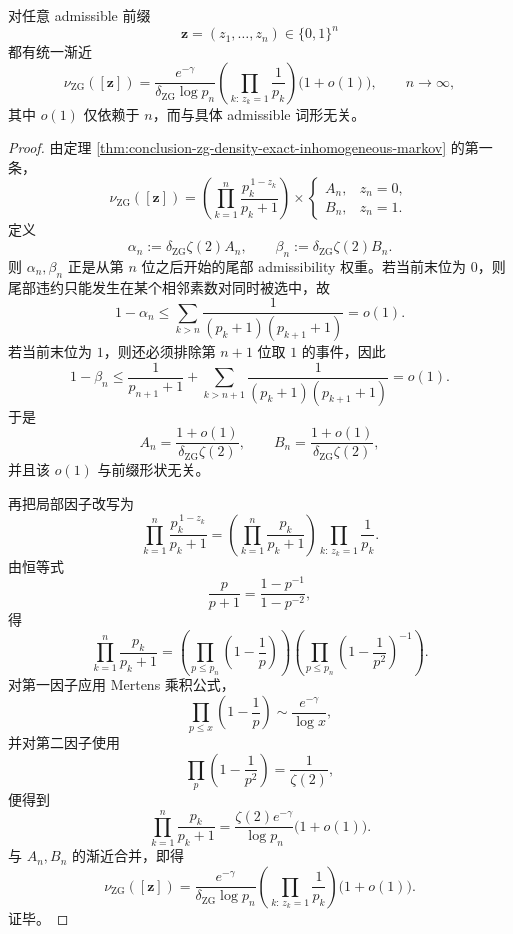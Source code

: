 \begin{theorem}\label{thm:conclusion-zg-cylinder-uniform-asymptotic}
对任意 admissible 前缀
\[
\mathbf z=(z_1,\dots,z_n)\in\{0,1\}^n
\]
都有统一渐近
\[
\nu_{\mathrm{ZG}}([\mathbf z])
=
\frac{e^{-\gamma}}{\delta_{\mathrm{ZG}}\log p_n}
\left(
\prod_{k:\,z_k=1}\frac1{p_k}
\right)
\bigl(1+o(1)\bigr),
\qquad n\to\infty,
\]
其中 \(o(1)\) 仅依赖于 \(n\)，而与具体 admissible 词形无关。
\end{theorem}
\begin{proof}
由定理 \ref{thm:conclusion-zg-density-exact-inhomogeneous-markov} 的第一条，
\[
\nu_{\mathrm{ZG}}([\mathbf z])
=
\left(\prod_{k=1}^{n}\frac{p_k^{\,1-z_k}}{p_k+1}\right)
\times
\begin{cases}
A_n,& z_n=0,\\
B_n,& z_n=1.
\end{cases}
\]
定义
\[
\alpha_n:=\delta_{\mathrm{ZG}}\zeta(2)A_n,
\qquad
\beta_n:=\delta_{\mathrm{ZG}}\zeta(2)B_n.
\]
则 \(\alpha_n,\beta_n\) 正是从第 \(n\) 位之后开始的尾部 admissibility 权重。若当前末位为 \(0\)，则尾部违约只能发生在某个相邻素数对同时被选中，故
\[
1-\alpha_n
\le
\sum_{k>n}\frac{1}{(p_k+1)(p_{k+1}+1)}
=o(1).
\]
若当前末位为 \(1\)，则还必须排除第 \(n+1\) 位取 \(1\) 的事件，因此
\[
1-\beta_n
\le
\frac{1}{p_{n+1}+1}
+
\sum_{k>n+1}\frac{1}{(p_k+1)(p_{k+1}+1)}
=o(1).
\]
于是
\[
A_n=\frac{1+o(1)}{\delta_{\mathrm{ZG}}\zeta(2)},
\qquad
B_n=\frac{1+o(1)}{\delta_{\mathrm{ZG}}\zeta(2)},
\]
并且该 \(o(1)\) 与前缀形状无关。

再把局部因子改写为
\[
\prod_{k=1}^{n}\frac{p_k^{\,1-z_k}}{p_k+1}
=
\left(\prod_{k=1}^{n}\frac{p_k}{p_k+1}\right)
\prod_{k:\,z_k=1}\frac1{p_k}.
\]
由恒等式
\[
\frac{p}{p+1}=\frac{1-p^{-1}}{1-p^{-2}},
\]
得
\[
\prod_{k=1}^{n}\frac{p_k}{p_k+1}
=
\left(\prod_{p\le p_n}\left(1-\frac1p\right)\right)
\left(\prod_{p\le p_n}\left(1-\frac1{p^2}\right)^{-1}\right).
\]
对第一因子应用 Mertens 乘积公式，
\[
\prod_{p\le x}\left(1-\frac1p\right)\sim \frac{e^{-\gamma}}{\log x},
\]
并对第二因子使用
\[
\prod_{p}\left(1-\frac1{p^2}\right)=\frac1{\zeta(2)},
\]
便得到
\[
\prod_{k=1}^{n}\frac{p_k}{p_k+1}
=
\frac{\zeta(2)e^{-\gamma}}{\log p_n}\bigl(1+o(1)\bigr).
\]
与 \(A_n,B_n\) 的渐近合并，即得
\[
\nu_{\mathrm{ZG}}([\mathbf z])
=
\frac{e^{-\gamma}}{\delta_{\mathrm{ZG}}\log p_n}
\left(\prod_{k:\,z_k=1}\frac1{p_k}\right)
\bigl(1+o(1)\bigr).
\]
证毕。
\end{proof}

